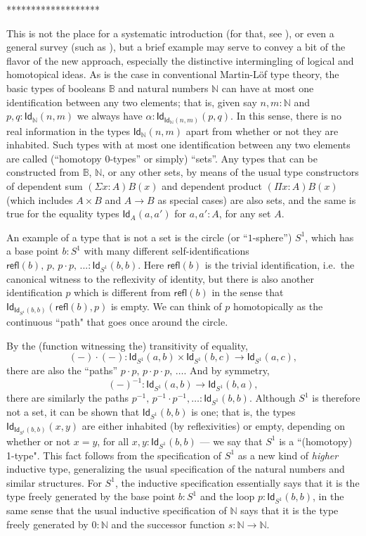 \documentclass[11pt]{article}
\newcommand{\B}{\ensuremath{\mathbb{B}}}
\newcommand{\N}{\ensuremath{\mathbb{N}}}
\newcommand{\Id}{\mathsf{Id}}
\newcommand{\id}[1]{\Id_{#1}}
\newcommand{\refl}{\mathsf{refl}}
\theoremstyle{remark}
\theoremstyle{definition}
\begin{document}
*******************

This is not the place for a systematic introduction (for that, see \cite{HoTTbook}), or even a general survey (such as \cite{apw,pw}), but a brief example may serve to convey a bit of the flavor of the new approach, especially the distinctive intermingling of logical and homotopical ideas.  As is the case in conventional Martin-L\"of type theory, the basic types of booleans $\B$ and natural numbers $\N$ can have at most one identification between any two elements; that is, given say $n, m : \N$ and $p,q: \id{\N}(n,m)$ we always have $\alpha:\id{\id{\N}(n,m)}(p,q)$.  In this sense, there is no real information in the types $\id{\N}(n,m)$ apart from whether or not they are inhabited.  Such types with at most one identification between any two elements are called (``homotopy 0-types'' or simply) ``sets''.  Any types that can be constructed from $\B$, $\N$, or any other sets, by means of the usual type constructors of dependent sum $(\Sigma{x:A})B(x)$ and dependent product $(\Pi{x:A})B(x)$ (which includes $A\times B$ and $A\rightarrow B$ as special cases) are also sets, and the same is true for the equality types $\id{A}(a,a')$ for $a,a':A$, for any set $A$.  

 An example of a type that is not a set is the circle (or ``$1$-sphere'') $S^1$, which has a base point $b: S^1$ with many different self-identifications $\refl(b),\, p,\, p\cdot p,\, ... :\id{S^1}(b,b)$.  Here $\refl(b)$ is the trivial identification, i.e.\ the canonical witness to the reflexivity of identity, but there is also another identification $p$ which is different from $\refl(b)$ in the sense that $\id{\id{S^1}(b,b)}(\refl(b), p)$ is empty.  We can think of $p$ homotopically as the continuous ``path" that goes once around the circle. 

%
%
By the (function witnessing the) transitivity of equality, 
\[
(-)\cdot(-) : \id{S^1}(a,b) \times \id{S^1}(b,c)\to \id{S^1}(a,c),
\]
 there are also the ``paths'' $p\cdot p,\, p\cdot p\cdot p,\, \ldots$.   And by symmetry,
 \[
 (-)^{-1}:\id{S^1}(a,b) \to \id{S^1}(b,a),
 \]
 there are similarly the paths $p^{-1},\, p^{-1}\cdot p^{-1}, \ldots :\id{S^1}(b,b)$.  Although $S^1$ is therefore not a set, it can be shown that $\id{S^1}(b,b)$ is one; that is, the types $\id{\id{S^1}(b,b)}(x,y)$ are either inhabited (by reflexivities) or empty, depending on whether or not $x=y$, for all $x,y : \id{S^1}(b,b)$ --- we say that $S^1$ is a ``(homotopy) 1-type".  This fact follows from the specification of $S^1$ as a new kind of \emph{higher} inductive type, generalizing the usual specification of the natural numbers and similar structures.  For $S^1$, the inductive specification essentially says that it is the type freely generated by the base point $b:S^1$ and the loop $p:\id{S^1}(b,b)$, in the same sense that the usual inductive specification of $\N$ says that it is the type freely generated by $0:\N$ and the successor function $s:\N\to\N$.  
  
\end{document}
